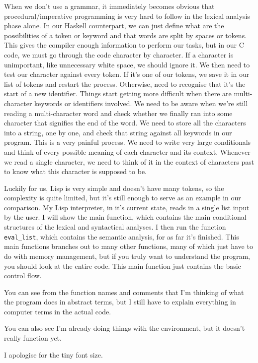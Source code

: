 \documentclass[11pt]{article}
\begin{document}
When we don't use a grammar, it immediately becomes obvious that
procedural/imperative programming is very hard to follow in the lexical
analysis phase alone. In our Haskell counterpart, we can just define what are
the possibilities of a token or keyword and that words are split by spaces or
tokens. This gives the compiler enough information to perform our tasks, but in
our C code, we must go through the code character by character. If a character
is unimportant, like unnecessary white space, we should ignore it. We then need
to test our character against every token. If it's one of our tokens, we save
it in our list of tokens and restart the process. Otherwise, need to recognise
that it's the start of a new identifier. Things start getting more difficult
when there are multi-character keywords or identifiers involved. We need to be
aware when we're still reading a multi-character word and check whether we
finally ran into some character that signifies the end of the word. We need to
store all the characters into a string, one by one, and check that string
against all keywords in our program. This is a very painful process. We need to
write very large conditionals and think of every possible meaning of each
character and its context. Whenever we read a single character, we need to
think of it in the context of characters past to know what this character is
supposed to be.

Luckily for us, Lisp is very simple and doesn't have many tokens, so the
complexity is quite limited, but it's still enough to serve as an example in
our comparison. My Lisp interpreter, in it's current state, reads in a single
list input by the user. I will show the main function, which contains the main
conditional structures of the lexical and syntactical analyses. I then run the
function \texttt{eval\_list}, which contains the semantic analysis, for as far
it's finished. This main functions branches out to many other functions, many
of which just have to do with memory management, but if you truly want to
understand the program, you should look at the entire code. This main function
just contains the basic control flow.

You can see from the function names and comments that I'm thinking of what the
program does in abstract terms, but I still have to explain everything in
computer terms in the actual code.

You can also see I'm already doing things with the environment, but it doesn't
really function yet.

I apologise for the tiny font size.
\end{document}
